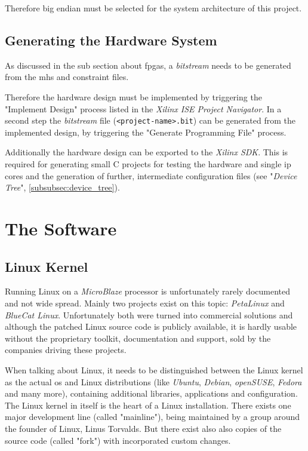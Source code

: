Therefore big endian must be selected for the system architecture of this project.

\subsection{Generating the Hardware System}

As discussed in the sub section about \gls{fpga}s, a \textit{bitstream} needs to be generated from the \gls{mhs} and constraint files.

Therefore the hardware design must be implemented by triggering the "Implement Design" process listed in the \textit{Xilinx ISE Project Navigator}. In a second step the \textit{bitstream} file (\texttt{<project-name>.bit}) can be generated from the implemented design, by triggering the "Generate Programming File" process.

Additionally the hardware design can be exported to the \textit{Xilinx SDK}. This is required for generating small C projects for testing the hardware and single \gls{ip} cores and the generation of further, intermediate configuration files (see "\textit{Device Tree}", \ref{subsubsec:device_tree}).


\section{The Software}

\subsection{Linux Kernel}

Running Linux on a \textit{MicroBlaze} processor is unfortunately rarely documented and not wide spread. Mainly two projects exist on this topic: \textit{PetaLinux} and \textit{BlueCat Linux}. Unfortunately both were turned into commercial solutions and although the patched Linux source code is publicly available, it is hardly usable without the proprietary toolkit, documentation and support, sold by the companies driving these projects.

When talking about Linux, it needs to be distinguished between the Linux kernel as the actual \gls{os} and Linux distributions (like \textit{Ubuntu}, \textit{Debian}, \textit{openSUSE}, \textit{Fedora} and many more), containing additional libraries, applications and configuration. The Linux kernel in itself is the heart of a Linux installation. There exists one major development line (called "mainline"), being maintained by a group around the founder of Linux, Linus Torvalds. But there exist also also copies of the source code (called "fork") with incorporated custom changes.

